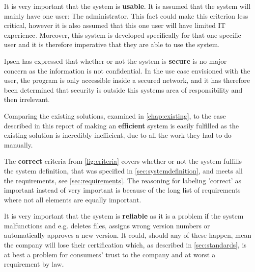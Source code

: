 \documentclass[../../master.tex]{subfiles}
\begin{document}
It is very important that the system is \textbf{usable}.
It is assumed that the system will mainly have one user: The administrator. %
This fact could make this criterion less critical, however it is also assumed that this one user will have limited IT experience.
Moreover, this system is developed specifically for that one specific user and it is therefore imperative that they are able to use the system. %

Ipsen has expressed that whether or not the system is \textbf{secure} is no major concern as the information is not confidential.
In the use case envisioned with the user, the program is only accessible inside a secured network, and it has therefore been determined that security is outside this systems area of responsibility and then irrelevant.

Comparing the existing solutions, examined in \cref{chap:existing}, to the case described in this report of making an \textbf{efficient} system is easily fulfilled as the existing solution is incredibly inefficient, due to all the work they had to do manually.

The \textbf{correct} criteria from \cref{fig:criteria} covers whether or not the system fulfills the system definition, that was specified in \cref{sec:systemdefinition}, and meets all the requirements, see \cref{sec:requirements}.
The reasoning for labeling 'correct' as important instead of very important is because of the long list of requirements where not all elements are equally important.

It is very important that the system is \textbf{reliable} as it is a problem if the system malfunctions and e.g. deletes files, assigns wrong version numbers or automatically approves a new version.
It could, should any of these happen, mean the company will lose their certification which, as described in \cref{sec:standards}, is at best a problem for consumers' trust to the company and at worst a requirement by law.
\end{document}
